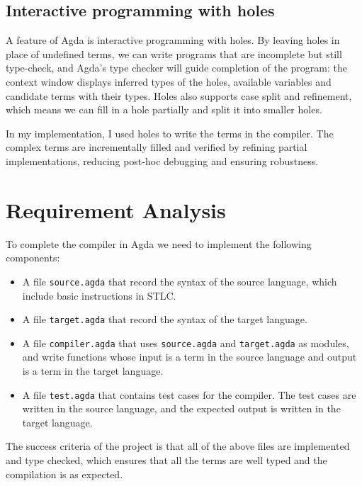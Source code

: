 \documentclass[12pt,a4paper]{report}
\theoremstyle{definition}
\begin{document}
        
        \subsection{Interactive programming with holes} \label{subsec: holes}
        A feature of Agda is interactive programming with holes. By leaving holes in place of undefined terms, we can write programs that are incomplete but still type-check, and Agda's type checker will guide completion of the program: the context window displays inferred types of the holes, available variables and candidate terms with their types. Holes also supports case split and refinement, which means we can fill in a hole partially and split it into smaller holes. 

        In my implementation, I used holes to write the terms in the compiler. The complex terms are incrementally filled and verified by refining partial implementations, reducing post-hoc debugging and ensuring robustness.


    \section{Requirement Analysis}
    To complete the compiler in Agda we need to implement the following components:
    \begin{itemize}
        \item 
            A file \texttt{source.agda} that record the syntax of the source language, which include basic instructions in STLC.

        \item
            A file \texttt{target.agda} that record the syntax of the target language.

        \item
            A file \texttt{compiler.agda} that uses \texttt{source.agda} and \texttt{target.agda} as modules, and write functions whose input is a term in the source language and output is a term in the target language.
        \item 
            A file \texttt{test.agda} that contains test cases for the compiler. The test cases are written in the source language, and the expected output is written in the target language. 
    \end{itemize}
    The success criteria of the project is that all of the above files are implemented and type checked, which ensures that all the terms are well typed and the compilation is as expected.
\end{document}
